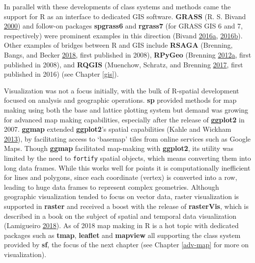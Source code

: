 \documentclass[]{krantz}
\begin{document}
In parallel with these developments of class systems and methods came the support for R as an interface to dedicated GIS software.
\textbf{GRASS} (R. S. Bivand \protect\hyperlink{ref-bivand_using_2000}{2000}) and follow-on packages \textbf{spgrass6} and \textbf{rgrass7} (for GRASS GIS 6 and 7, respectively) were prominent examples in this direction (Bivand \protect\hyperlink{ref-bivand_rgrass7_2016}{2016}\protect\hyperlink{ref-bivand_rgrass7_2016}{a}, \protect\hyperlink{ref-bivand_spgrass6_2016}{2016}\protect\hyperlink{ref-bivand_spgrass6_2016}{b}).
Other examples of bridges between R and GIS include \textbf{RSAGA} (Brenning, Bangs, and Becker \protect\hyperlink{ref-R-RSAGA}{2018}, first published in 2008), \textbf{RPyGeo} (Brenning \protect\hyperlink{ref-brenning_arcgis_2012}{2012}\protect\hyperlink{ref-brenning_arcgis_2012}{a}, first published in 2008), and \textbf{RQGIS} (Muenchow, Schratz, and Brenning \protect\hyperlink{ref-muenchow_rqgis:_2017}{2017}, first published in 2016) (see Chapter \ref{gis}).

Visualization was not a focus initially, with the bulk of R-spatial development focused on analysis and geographic operations.
\textbf{sp} provided methods for map making using both the base and lattice plotting system but demand was growing for advanced map making capabilities, especially after the release of \textbf{ggplot2} in 2007.
\textbf{ggmap} extended \textbf{ggplot2}'s spatial capabilities (Kahle and Wickham \protect\hyperlink{ref-kahle_ggmap_2013}{2013}), by facilitating access to `basemap' tiles from online services such as Google Maps.
Though \textbf{ggmap} facilitated map-making with \textbf{ggplot2}, its utility was limited by the need to \texttt{fortify} spatial objects, which means converting them into long data frames.
While this works well for points it is computationally inefficient for lines and polygons, since each coordinate (vertex) is converted into a row, leading to huge data frames to represent complex geometries.
Although geographic visualization tended to focus on vector data, raster visualization is supported in \textbf{raster} and received a boost with the release of \textbf{rasterVis}, which is described in a book on the subject of spatial and temporal data visualization (Lamigueiro \protect\hyperlink{ref-lamigueiro_displaying_2018}{2018}).
As of 2018 map making in R is a hot topic with dedicated packages such as \textbf{tmap}, \textbf{leaflet} and \textbf{mapview} all supporting the class system provided by \textbf{sf}, the focus of the next chapter (see Chapter \ref{adv-map} for more on visualization).
\end{document}
